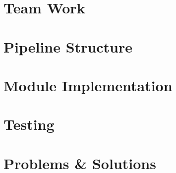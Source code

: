 \section{Team Work}
\section{Pipeline Structure}
\section{Module Implementation}
\section{Testing}
\section{Problems \& Solutions}
